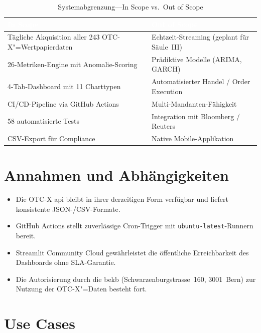 \documentclass[11pt, a4paper, oneside, openany]{report}
\begin{document}
\begin{table}[H]
\centering
\caption{Systemabgrenzung\;---\;In Scope vs.\ Out of Scope}
\label{tab:abgrenzung}
\sffamily\small
\begin{tabularx}{\textwidth}{X X}
  \toprule
  \rowcolor{DeepNavy} \textcolor{white}{\textbf{In Scope}} & \textcolor{white}{\textbf{Out of Scope}} \\
  \midrule
  Tägliche Akquisition aller 243 OTC-X"=Wertpapierdaten     & Echtzeit-Streaming (geplant für Säule~III) \\
  26-Metriken-Engine mit Anomalie-Scoring                     & Prädiktive Modelle (ARIMA, GARCH) \\
  4-Tab-Dashboard mit 11 Charttypen                           & Automatisierter Handel / Order Execution \\
  CI/CD-Pipeline via GitHub Actions                           & Multi-Mandanten-Fähigkeit \\
  58 automatisierte Tests                                      & Integration mit Bloomberg / Reuters \\
  CSV-Export für Compliance                                    & Native Mobile-Applikation \\
  \bottomrule
\end{tabularx}
\end{table}

\section{Annahmen und Abhängigkeiten}

\begin{itemize}
  \item Die OTC-X \gls{api} bleibt in ihrer derzeitigen Form verfügbar und liefert konsistente JSON-/CSV-Formate.
  \item GitHub Actions stellt zuverlässige Cron-Trigger mit \texttt{ubuntu-latest}-Runnern bereit.
  \item Streamlit Community Cloud gewährleistet die öffentliche Erreichbarkeit des Dashboards ohne SLA-Garantie.
  \item Die Autorisierung durch die \gls{bekb} (Schwarzenburgstrasse~160, 3001~Bern) zur Nutzung der OTC-X"=Daten besteht fort.
\end{itemize}

\section{Use Cases}
\label{sec:usecases}
\end{document}
